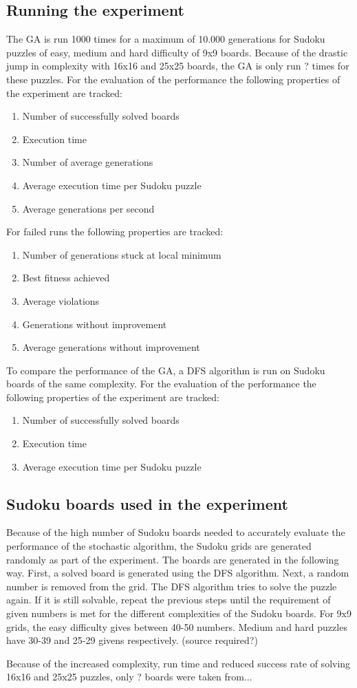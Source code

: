 \subsection{Running the experiment}
The GA is run 1000 times for a maximum of 10.000 generations for Sudoku puzzles of easy, medium and hard difficulty of 9x9 boards. Because of the drastic jump in complexity with 16x16 and 25x25 boards, the GA is only run ? times for these puzzles. For the evaluation of the performance the following properties of the experiment are tracked:
\begin{enumerate}
	\item Number of successfully solved boards
	\item Execution time
	\item Number of average generations
	\item Average execution time per Sudoku puzzle
	\item Average generations per second
\end{enumerate}

For failed runs the following properties are tracked:
\begin{enumerate}
	\item Number of generations stuck at local minimum
	\item Best fitness achieved
	\item Average violations
	\item Generations without improvement
	\item Average generations without improvement
\end{enumerate}

To compare the performance of the GA, a DFS algorithm is run on Sudoku boards of the same complexity. For the evaluation of the performance the following properties of the experiment are tracked:
\begin{enumerate}
	\item Number of successfully solved boards
	\item Execution time
	\item Average execution time per Sudoku puzzle
\end{enumerate}

\subsection{Sudoku boards used in the experiment}
Because of the high number of Sudoku boards needed to accurately evaluate the performance of the stochastic algorithm, the Sudoku grids are generated randomly as part of the experiment. The boards are generated in the following way. 
First, a solved board is generated using the DFS algorithm. Next, a random number is removed from the grid. The DFS algorithm tries to solve the puzzle again. If it is still solvable, repeat the previous steps until the requirement of given numbers is met for the different complexities of the Sudoku boards. For 9x9 grids, the easy difficulty gives between 40-50 numbers. Medium and hard puzzles have 30-39 and 25-29 givens respectively. (source required?)

Because of the increased complexity, run time and reduced success rate of solving 16x16 and 25x25 puzzles, only ? boards were taken from...